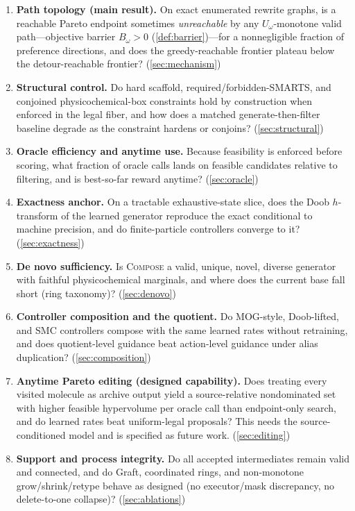 \documentclass{article}
\newcommand{\method}{\textsc{Compose}\xspace}
\theoremstyle{definition}
\theoremstyle{remark}
\begin{document}
\begin{enumerate}[leftmargin=*]
    \item[Q1.] \textbf{Path topology (main result).} On exact enumerated rewrite graphs, is a reachable Pareto endpoint sometimes \emph{unreachable} by any $U_\omega$-monotone valid path---objective barrier $B_\omega>0$ (\cref{def:barrier})---for a nonnegligible fraction of preference directions, and does the greedy-reachable frontier plateau below the detour-reachable frontier? (\cref{sec:mechanism})
    \item[Q2.] \textbf{Structural control.} Do hard scaffold, required/forbidden-SMARTS, and conjoined physicochemical-box constraints hold by construction when enforced in the legal fiber, and how does a matched generate-then-filter baseline degrade as the constraint hardens or conjoins? (\cref{sec:structural})
    \item[Q3.] \textbf{Oracle efficiency and anytime use.} Because feasibility is enforced before scoring, what fraction of oracle calls lands on feasible candidates relative to filtering, and is best-so-far reward anytime? (\cref{sec:oracle})
    \item[Q4.] \textbf{Exactness anchor.} On a tractable exhaustive-state slice, does the Doob $h$-transform of the learned generator reproduce the exact conditional to machine precision, and do finite-particle controllers converge to it? (\cref{sec:exactness})
    \item[Q5.] \textbf{De novo sufficiency.} Is \method a valid, unique, novel, diverse generator with faithful physicochemical marginals, and where does the current base fall short (ring taxonomy)? (\cref{sec:denovo})
    \item[Q6.] \textbf{Controller composition and the quotient.} Do MOG-style, Doob-lifted, and SMC controllers compose with the same learned rates without retraining, and does quotient-level guidance beat action-level guidance under alias duplication? (\cref{sec:composition})
    \item[Q7.] \textbf{Anytime Pareto editing (designed capability).} Does treating every visited molecule as archive output yield a source-relative nondominated set with higher feasible hypervolume per oracle call than endpoint-only search, and do learned rates beat uniform-legal proposals? This needs the source-conditioned model and is specified as future work. (\cref{sec:editing})
    \item[Q8.] \textbf{Support and process integrity.} Do all accepted intermediates remain valid and connected, and do Graft, coordinated rings, and non-monotone grow/shrink/retype behave as designed (no executor/mask discrepancy, no delete-to-one collapse)? (\cref{sec:ablations})
\end{enumerate}
\end{document}

